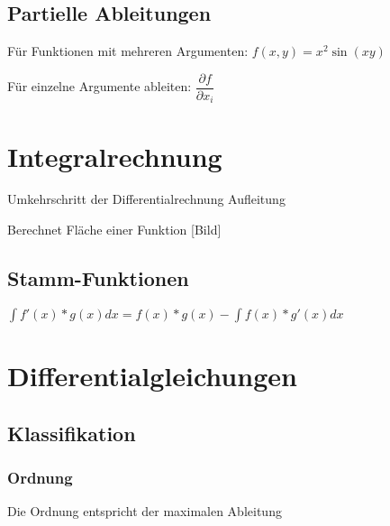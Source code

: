 \documentclass[10pt,a4paper]{article}
\begin{document}


\subsection{Partielle Ableitungen}

Für Funktionen mit mehreren Argumenten:
$f(x,y) = x^2 \sin(xy)$

Für einzelne Argumente ableiten:
$\dfrac{\partial f}{\partial x_i}$





\section{Integralrechnung}

Umkehrschritt der Differentialrechnung
Aufleitung

Berechnet Fläche einer Funktion
[Bild]


\subsection{Stamm-Funktionen}





$\int f'(x) * g(x) dx = f(x)*g(x) - \int f(x) * g'(x) dx$




\section{Differentialgleichungen}

\subsection{Klassifikation}


\subsubsection{Ordnung}
	Die Ordnung entspricht der maximalen Ableitung
\end{document}
